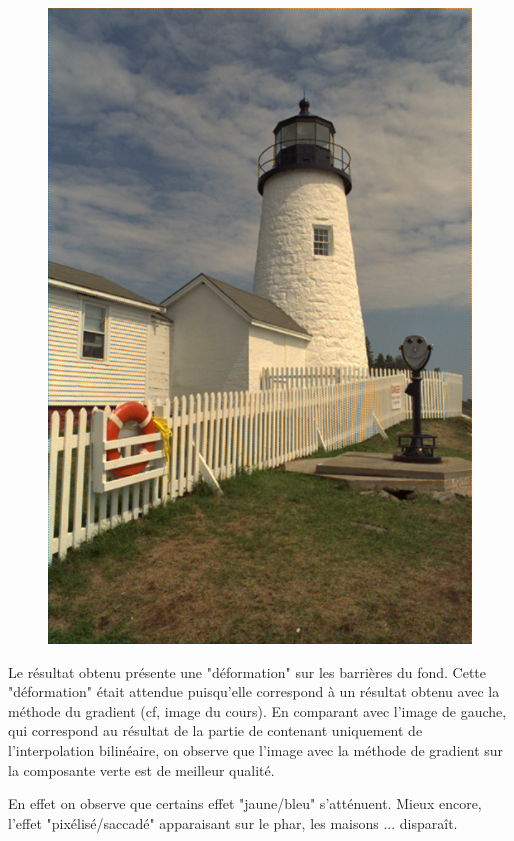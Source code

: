 \documentclass[a4paper,12pt]{report}
\begin{document}
\begin{figure}[!ht]
	\includegraphics[scale=0.4]{./image/part2-4.png}
\end{figure}

Le résultat obtenu présente une "déformation" sur les barrières du fond. Cette "déformation" était attendue puisqu'elle correspond à un résultat obtenu avec la méthode du gradient (cf, image du cours). En comparant avec l'image de gauche, qui correspond au résultat de la partie de contenant uniquement de l'interpolation bilinéaire, on observe que l'image avec la méthode de gradient sur la composante verte est de meilleur qualité.

En effet on observe que certains effet "jaune/bleu" s'atténuent. Mieux encore, l'effet "pixélisé/saccadé" apparaisant sur le phar, les maisons ... disparaît.
\end{document}
